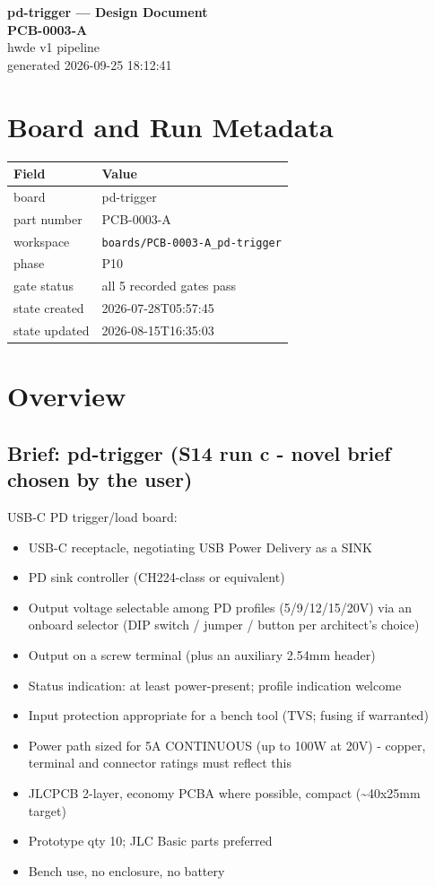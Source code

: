 \documentclass[11pt,a4paper]{article}
\begin{document}
\sloppy
\begin{center}
{\LARGE\bfseries pd-trigger --- Design Document}\\[6pt]
{\Large\bfseries PCB-0003-A}\\[6pt]
{\large hwde v1 pipeline}\\[2pt]
generated 2026-09-25 18:12:41
\end{center}
\tableofcontents

\section{Board and Run Metadata}
{\small
\begin{longtable}{lp{11cm}}
\toprule
\textbf{Field} & \textbf{Value} \\
\midrule
\endhead
board & pd-trigger \\
part number & PCB-0003-A \\
workspace & \texttt{boards/PCB-0003-A\_pd-trigger} \\
phase & P10 \\
gate status & all 5 recorded gates pass \\
state created & 2026-07-28T05:57:45 \\
state updated & 2026-08-15T16:35:03 \\
\bottomrule
\end{longtable}
}
\section{Overview}
\subsection*{Brief: pd-trigger (S14 run c - novel brief chosen by the user)}
USB-C PD trigger/load board:

\begin{itemize}
\item USB-C receptacle, negotiating USB Power Delivery as a SINK
\item PD sink controller (CH224-class or equivalent)
\item Output voltage selectable among PD profiles (5/9/12/15/20V) via an
onboard selector (DIP switch / jumper / button per architect's choice)
\item Output on a screw terminal (plus an auxiliary 2.54mm header)
\item Status indication: at least power-present; profile indication welcome
\item Input protection appropriate for a bench tool (TVS; fusing if warranted)
\item Power path sized for 5A CONTINUOUS (up to 100W at 20V) - copper, terminal
and connector ratings must reflect this
\item JLCPCB 2-layer, economy PCBA where possible, compact (\textasciitilde{}40x25mm target)
\item Prototype qty 10; JLC Basic parts preferred
\item Bench use, no enclosure, no battery
\end{itemize}
\end{document}
